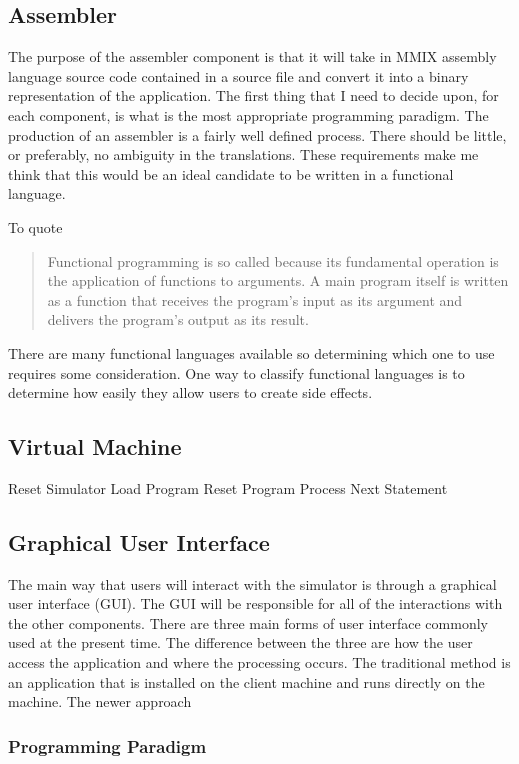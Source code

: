 \documentclass[11pt]{article} %
\begin{document}
\subsection{Assembler}
% 
The purpose of the assembler component is that it will take in MMIX assembly language source code contained in a source file and convert it into a binary representation of the application.  The first thing that I need to decide upon, for each component, is what is the most appropriate programming paradigm.  The production of an assembler is a fairly well defined process.  There should be little, or preferably, no ambiguity in the translations.  These requirements make me think that this would be an ideal candidate to be written in a functional language.

To quote 
\begin{quote}Functional programming is so called because its fundamental operation is the application of functions to arguments. A main program itself is written as a function that receives the program’s input as its argument and delivers the program’s output as its result.\end{quote}
There are many functional languages available so determining which one to use requires some consideration.  One way to classify functional languages is to determine how easily they allow users to create side effects.

\subsection{Virtual Machine}
%
Reset Simulator
Load Program
Reset Program
Process Next Statement

\subsection{Graphical User Interface}
%
The main way that users will interact with the simulator is through a graphical user interface (GUI).  The GUI will be responsible for all of the interactions with the other components. There are three main forms of user interface commonly used at the present time.  The difference between the three are how the user access the application and where the processing occurs.  The traditional method is an application that is installed on the client machine and runs directly on the machine.  The newer approach 

\subsubsection{Programming Paradigm}
\end{document}
